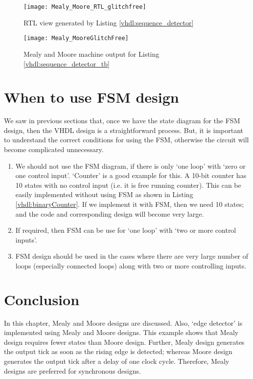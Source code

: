 \begin{figure}[!h]
	\centering
	\texttt{[image: Mealy\_Moore\_RTL\_glitchfree]}
	\caption{RTL view generated by Listing \ref{vhdl:sequence_detector}}
	\label{fig:Mealy_Moore_RTL_glitchfree}
\end{figure}

\begin{figure}[!h]
	\centering
	\texttt{[image: Mealy\_MooreGlitchFree]}
	\caption{Mealy and Moore machine output for Listing \ref{vhdl:sequence_detector_tb}}
	\label{fig:Mealy_MooreGlitchFree}
\end{figure}






\section{When to use FSM design}
We saw in previous sections that, once we have the state diagram for the FSM design, then the VHDL design is a straightforward process. But, it is important to understand the correct conditions for using the FSM, otherwise the circuit will become complicated unnecessary. 

\begin{enumerate}
	\item We should not use the FSM diagram, if there is only `one loop' with `zero or one control input'. `Counter' is a good example for this. A 10-bit counter has 10 states with no control input (i.e. it is free running counter). This can be easily implemented without using FSM as shown in Listing \ref{vhdl:binaryCounter}. If we implement it with FSM, then we need 10 states; and the code and corresponding design will become very large. 
	
	\item If required, then FSM can be use for `one loop' with `two or more control inputs'. 
	
	\item FSM design should be used in the cases where there are very large number of loops (especially connected loops) along with two or more controlling inputs. 
	
\end{enumerate}
\section{Conclusion}
In this chapter, Mealy and Moore designs are discussed. Also, `edge detector' is implemented using Mealy and Moore designs. This example shows that Mealy design requires fewer states than Moore design. Further, Mealy design generates the output tick as soon as the rising edge is detected; whereas Moore design generates the output tick after a delay of one clock cycle. Therefore, Mealy designs are preferred for synchronous designs. 